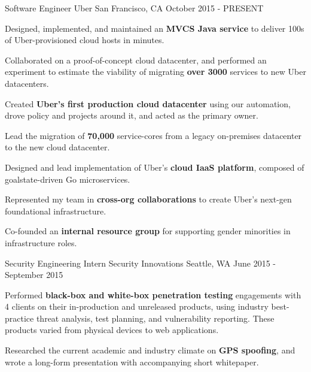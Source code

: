 
\begin{cventries}
  \cventry
    {Software Engineer} %
    {Uber} %
    {San Francisco, CA} %
    {October 2015 - PRESENT} %
    {
      \begin{cvitems} %
        \item {Designed, implemented, and maintained an \textbf{MVCS Java service} to deliver 100s of Uber-provisioned cloud hosts in minutes.}
        \item {Collaborated on a proof-of-concept cloud datacenter, and performed an experiment to estimate the viability of migrating \textbf{over 3000} services to new Uber datacenters.}
        \item {Created \textbf{Uber's first production cloud datacenter} using our automation, drove policy and projects around it, and acted as the primary owner.}
        \item {Lead the migration of \textbf{70,000} service-cores from a legacy on-premises datacenter to the new cloud datacenter.}
        \item {Designed and lead implementation of Uber's \textbf{cloud IaaS platform}, composed of goalstate-driven Go microservices.}
        \item {Represented my team in \textbf{cross-org collaborations} to create Uber's next-gen foundational infrastructure.}
        \item {Co-founded an \textbf{internal resource group} for supporting gender minorities in infrastructure roles.}
      \end{cvitems}
    }
    
  \cventry
    {Security Engineering Intern} %
    {Security Innovations} %
    {Seattle, WA} %
    {June 2015 - September 2015} %
    {
      \begin{cvitems} %
        \item {Performed \textbf{black-box and white-box penetration testing} engagements with 4 clients on their in-production and unreleased products, using industry best-practice threat analysis, test planning, and vulnerability reporting. These products varied from physical devices to web applications.}
        \item {Researched the current academic and industry climate on \textbf{GPS spoofing}, and wrote a long-form presentation with accompanying short whitepaper.}
      \end{cvitems}
    }


\end{cventries}
